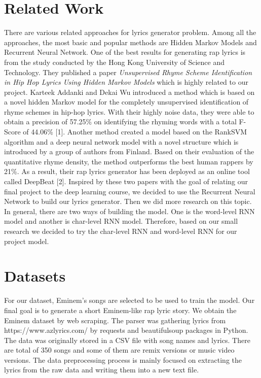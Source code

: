 \documentclass[11pt,a4paper]{article}
\begin{document}
\section{Related Work}
There are various related approaches for lyrics generator problem. Among all the approaches, the most basic and popular methods are Hidden Markov Models and Recurrent Neural Network. One of the best results for generating rap lyrics is from the study conducted by the Hong Kong University of Science and Technology. They published a paper \emph{Unsupervised Rhyme Scheme Identification in Hip Hop Lyrics Using Hidden Markov Models} which is highly related to our project. Karteek Addanki and Dekai Wu introduced a method which is based on a novel hidden Markov model for the completely unsupervised identification of rhyme schemes in hip-hop lyrics. With their highly noise data, they were able to obtain a precision of 57.25\% on identifying the rhyming words with a total F-Score of 44.06\% [1]. Another method created a model based on the RankSVM algorithm and a deep neural network model with a novel structure which is introduced by a group of authors from Finland. Based on their evaluation of the quantitative rhyme density, the method outperforms the best human rappers by 21\%. As a result, their rap lyrics generator has been deployed as an online tool called DeepBeat [2]. Inspired by these two papers with the goal of relating our final project to the deep learning course, we decided to use the Recurrent Neural Network to build our lyrics generator. Then we did more research on this topic. In general, there are two ways of building the model. One is the word-level RNN model and another is char-level RNN model. Therefore, based on our small research we decided to try the char-level RNN and word-level RNN for our project model.


\section{Datasets}
For our dataset, Eminem's songs are selected to be used to train the model. Our final goal is to generate a short Eminem-like rap lyric story. We obtain the Eminem dataset by web scraping. The parser was gathering lyrics from https://www.azlyrics.com/ by requests and beautifulsoup packages in Python. The data was originally stored in a CSV file with song names and lyrics. There are total of 350 songs and some of them are remix versions or music video versions. The data preprocessing process is mainly focused on extracting the lyrics from the raw data and writing them into a new text file.
\end{document}
